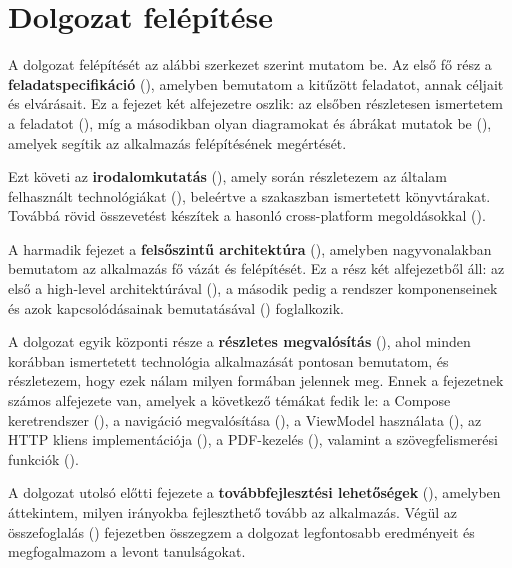 \section{Dolgozat felépítése}

A dolgozat felépítését az alábbi szerkezet szerint mutatom be. Az első fő rész a \textbf{feladatspecifikáció} (), amelyben bemutatom a kitűzött feladatot, annak céljait és elvárásait. Ez a fejezet két alfejezetre oszlik: az elsőben részletesen ismertetem a feladatot (), míg a másodikban olyan diagramokat és ábrákat mutatok be (), amelyek segítik az alkalmazás felépítésének megértését.

Ezt követi az \textbf{irodalomkutatás} (), amely során részletezem az általam felhasznált technológiákat (), beleértve a  szakaszban ismertetett könyvtárakat. Továbbá rövid összevetést készítek a hasonló cross-platform megoldásokkal ().

A harmadik fejezet a \textbf{felsőszintű architektúra} (), amelyben nagyvonalakban bemutatom az alkalmazás fő vázát és felépítését. Ez a rész két alfejezetből áll: az első a high-level architektúrával (), a második pedig a rendszer komponenseinek és azok kapcsolódásainak bemutatásával () foglalkozik.

A dolgozat egyik központi része a \textbf{részletes megvalósítás} (), ahol minden korábban ismertetett technológia alkalmazását pontosan bemutatom, és részletezem, hogy ezek nálam milyen formában jelennek meg. Ennek a fejezetnek számos alfejezete van, amelyek a következő témákat fedik le: a Compose keretrendszer (), a navigáció megvalósítása (), a ViewModel használata (), az HTTP kliens implementációja (), a PDF-kezelés (), valamint a szövegfelismerési funkciók ().

A dolgozat utolsó előtti fejezete a \textbf{továbbfejlesztési lehetőségek} (), amelyben áttekintem, milyen irányokba fejleszthető tovább az alkalmazás. Végül az összefoglalás () fejezetben összegzem a dolgozat legfontosabb eredményeit és megfogalmazom a levont tanulságokat.
